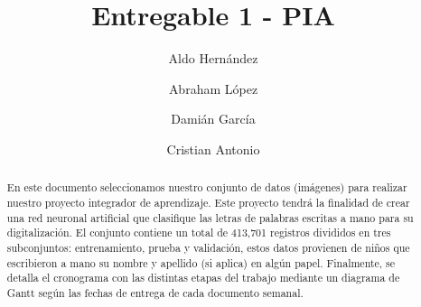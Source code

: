\documentclass[10pt]{article}
\begin{document}
	\begin{opening}
		\title{Entregable 1 - PIA}
		\author[Universidad Autónoma de Nuevo León, San Nicolás de los Garza, aldo.hernandezt@uanl.edu.mx]{Aldo Hernández}
		\author[Universidad Autónoma de Nuevo León, San Nicolás de los Garza, abraham.lopezg@uanl.edu.mx]{Abraham López}
		\author[Universidad Autónoma de Nuevo León, San Nicolás de los Garza, gilberto.garciam@uanl.edu.mx]{Damián García}
		\author[Universidad Autónoma de Nuevo León, San Nicolás de los Garza, cristian.antoniosnt@uanl.edu.mx]{Cristian Antonio}
		
		\begin{abstract}
			En este documento seleccionamos nuestro conjunto de datos (imágenes) para realizar nuestro proyecto integrador de aprendizaje. Este proyecto tendrá la finalidad de crear una red neuronal artificial que clasifique las letras de palabras escritas a mano para su digitalización. El conjunto contiene un total de 413,701 registros divididos en tres subconjuntos: entrenamiento, prueba y validación, estos datos provienen de niños que escribieron a mano su nombre y apellido (si aplica) en algún papel. Finalmente, se detalla el cronograma con las distintas etapas del trabajo mediante un diagrama de Gantt según las fechas de entrega de cada documento semanal.
		\end{abstract}
		
	\end{opening}
	
\end{document}
